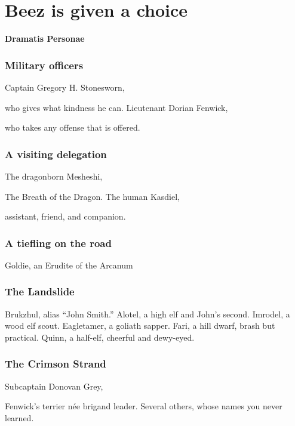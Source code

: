 \section{Beez is given a choice}
\textbf{\LARGE Dramatis Personae}
\begin{multicols}{2}


\subsubsection{Military officers}
Captain Gregory H. Stonesworn,\par who gives what kindness he can. \newline
Lieutenant Dorian Fenwick,\par who takes any offense that is offered.

\subsubsection{A visiting delegation}
The dragonborn Mesheshi,\par The Breath of the Dragon. \newline
The human Kasdiel,\par assistant, friend, and companion. \newline

\subsubsection{A tiefling on the road}
Goldie, an Erudite of the Arcanum


\subsubsection{The Landslide}
Brukzhul, alias ``John Smith.'' \newline
Alotel, a high elf and John's second. \newline
Imrodel, a wood elf scout. \newline
Eagletamer, a goliath sapper. \newline
Fari, a hill dwarf, brash but practical. \newline
Quinn, a half-elf, cheerful and dewy-eyed. \newline

\subsubsection{The Crimson Strand}
Subcaptain Donovan Grey,\par Fenwick's terrier n\'ee brigand leader. \newline
Several others, whose names you never learned.


\end{multicols}
